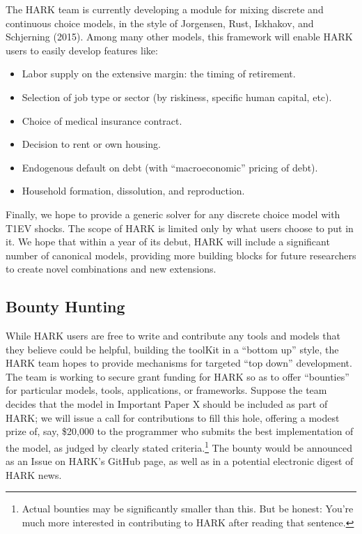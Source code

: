 \documentclass[12pt,titlepage,letterpaper]{econtex}
\begin{document}
The HARK team is currently developing a module for mixing discrete and continuous choice models, in the style of Jorgensen, Rust, Iskhakov, and Schjerning (2015).  Among many other models, this framework will enable HARK users to easily develop features like:
\begin{itemize}
\item Labor supply on the extensive margin: the timing of retirement.

\item Selection of job type or sector (by riskiness, specific human capital, etc).

\item Choice of medical insurance contract.

\item Decision to rent or own housing.

\item Endogenous default on debt (with ``macroeconomic'' pricing of debt).

\item Household formation, dissolution, and reproduction.
\end{itemize}

Finally, we hope to provide a generic solver for any discrete choice model with T1EV shocks.  The scope of HARK is limited only by what users choose to put in it.  We hope that within a year of its debut, HARK will include a significant number of canonical models, providing more building blocks for future researchers to create novel combinations and new extensions.

\subsection{Bounty Hunting}\label{sec:BountyHunting}

While HARK users are free to write and contribute any tools and models that they believe could be helpful, building the toolKit in a ``bottom up'' style, the HARK team hopes to provide mechanisms for targeted ``top down'' development.  The team is working to secure grant funding for HARK so as to offer ``bounties'' for particular models, tools, applications, or frameworks.  Suppose the team decides that the model in Important Paper X should be included as part of HARK; we will issue a call for contributions to fill this hole, offering a modest prize of, say, \$20,000 to the programmer who submits the best implementation of the model, as judged by clearly stated criteria.\footnote{Actual bounties may be significantly smaller than this.  But be honest: You're much more interested in contributing to HARK after reading that sentence.}  The bounty would be announced as an Issue on HARK's GitHub page, as well as in a potential electronic digest of HARK news.
\end{document}
